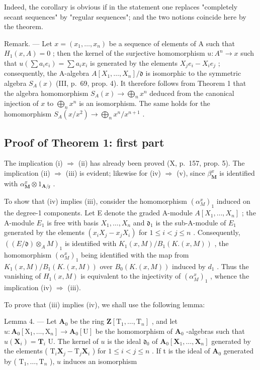Indeed, the corollary is obvious if in the statement one replaces "completely secant sequences" by "regular sequences"; and the two notions coincide here by the theorem.

Remark. --- Let \(x = (x_1, \ldots, x_n)\) be a sequence of elements of A such that \(H_1(x, A) = 0\) ; then the kernel of the surjective homomorphism \(u: A^n \to x\) such that \(u(\sum a_i e_i) = \sum a_i x_i\) is generated by the elements \(X_j e_i - X_i e_j\) ; consequently, the A-algebra \(A[X_1, \ldots, X_n] / \mathfrak{d}\) is isomorphic to the symmetric algebra \(S_A(x)\) (III, p.~69, prop. 4). It therefore follows from Theorem 1 that the algebra homomorphism \(S_A(x) \to \bigoplus_n x^n\) deduced from the canonical injection of \(x\) to \(\bigoplus_n x^n\) is an isomorphism. The same holds for the homomorphism \(S_A(x / x^2) \to \bigoplus_n x^n / x^{n+1}\) .

\subsection{Proof of Theorem 1: first part}

The implication (i) \(\Rightarrow\) (ii) has already been proved (X, p.~157, prop. 5). The implication (ii) \(\Rightarrow\) (iii) is evident; likewise for (iv) \(\Rightarrow\) (v), since \(\beta_{\mathbf{M}}^{x}\) is identified with \(\alpha_{\mathbf{M}}^{x} \otimes 1_{\mathbf{A}/\mathfrak{x}}\) .

To show that (iv) implies (iii), consider the homomorphism \((\alpha_{M}^{x})_{1}\) induced on the degree-1 components. Let E denote the graded A-module \(A[X_{1},\ldots,X_{n}]\) ; the A-module \(E_{1}\) is free with basis \(X_{1},\ldots,X_{n}\) and \(\mathfrak{d}_{1}\) is the sub-A-module of \(E_{1}\) generated by the elements \((x_{i}X_{j}-x_{j}X_{i})\) for \(1\leqslant i<j\leqslant n\) . Consequently, \(((E/\mathfrak{d})\otimes_{A}M)_{1}\) is identified with \(K_{1}(x,M)/B_{1}(K.(x,M))\) , the homomorphism \((\alpha_{M}^{x})_{1}\) being identified with the map from \(K_{1}(x,M)/B_{1}(K.(x,M))\) over \(B_{0}(K.(x,M))\) induced by \(d_{1}\) . Thus the vanishing of \(H_{1}(x,M)\) is equivalent to the injectivity of \((\alpha_{M}^{x})_{1}\) , whence the implication (iv) \(\Rightarrow\) (iii).

To prove that (iii) implies (iv), we shall use the following lemma:

Lemma 4. --- Let \(\mathbf{A}_{0}\) be the ring \(\mathbf{Z}[\mathrm{T}_{1},\ldots,\mathrm{T}_{n}]\) , and let \(u:\mathbf{A}_{0}[\mathrm{X}_{1},\ldots,\mathrm{X}_{n}] \to \mathbf{A}_{0}[\mathrm{U}]\) be the homomorphism of \(\mathbf{A}_{0}\) -algebras such that \(u(\mathbf{X}_{i}) = \mathbf{T}_{i}\) U. The kernel of \(u\) is the ideal \(\mathfrak{d}_{0}\) of \(\mathbf{A}_{0}[\mathbf{X}_{1},\ldots,\mathbf{X}_{n}]\) generated by the elements ( \(\mathrm{T}_{i}\mathbf{X}_{j}-\mathrm{T}_{j}\mathbf{X}_{i}\) ) for \(1 \leqslant i < j \leqslant n\) . If t is the ideal of \(\mathbf{A}_{0}\) generated by ( \(\mathrm{T}_{1},\ldots,\mathrm{T}_{n}\) ), \(u\) induces an isomorphism

